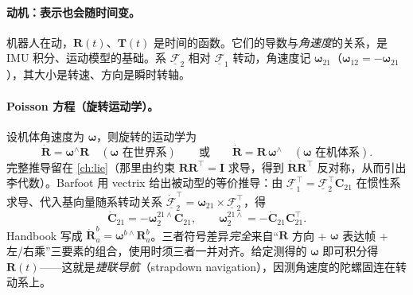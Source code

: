 \paragraph{动机：表示也会随时间变。}机器人在动，$\mathbf{R}(t)$、$\mathbf{T}(t)$ 是时间的函数。它们的导数与\emph{角速度}的关系，是 IMU 积分、运动模型的基础。系 $\underline{\mathcal{F}}_2$ 相对 $\underline{\mathcal{F}}_1$ 转动，角速度记 $\boldsymbol{\omega}_{21}$（$\boldsymbol{\omega}_{12}=-\boldsymbol{\omega}_{21}$），其大小是转速、方向是瞬时转轴\cite{barfoot2024state}。

\paragraph{Poisson 方程（旋转运动学）。}设机体角速度为 $\boldsymbol{\omega}$，则旋转的运动学为
\begin{equation}
  \dot{\mathbf{R}}=\boldsymbol{\omega}^\wedge\mathbf{R}\quad(\boldsymbol{\omega}\text{ 在世界系})\qquad\text{或}\qquad
  \dot{\mathbf{R}}=\mathbf{R}\,\boldsymbol{\omega}^\wedge\quad(\boldsymbol{\omega}\text{ 在机体系}).
  \label{eq:poisson}
\end{equation}
完整推导留在 \cref{ch:lie}（那里由约束 $\mathbf{R}\mathbf{R}^\top=\mathbf{I}$ 求导，得到 $\dot{\mathbf{R}}\mathbf{R}^\top$ 反对称，从而引出李代数）。Barfoot 用 vectrix 给出被动型的等价推导\cite{barfoot2024state}：由 $\underline{\mathcal{F}}_1^\top=\underline{\mathcal{F}}_2^\top\mathbf{C}_{21}$ 在惯性系求导、代入基向量随系转动关系 $\dot{\underline{\mathcal{F}}}_2^\top=\boldsymbol{\omega}_{21}\times\underline{\mathcal{F}}_2^\top$，得
\begin{equation}
  \dot{\mathbf{C}}_{21}=-\boldsymbol{\omega}_2^{21\wedge}\mathbf{C}_{21},\qquad
  \boldsymbol{\omega}_2^{21\wedge}=-\dot{\mathbf{C}}_{21}\mathbf{C}_{21}^\top.
  \label{eq:rb-poisson-barfoot}
\end{equation}
Handbook 写成 $\dot{\mathbf{R}}_a^b=\boldsymbol{\omega}^{b\wedge}\mathbf{R}_a^b$\cite{carlone2026handbook}。三者符号差异\emph{完全}来自“$\mathbf{R}$ 方向 + $\boldsymbol{\omega}$ 表达帧 + 左/右乘”三要素的组合，使用时须三者一并对齐。给定测得的 $\boldsymbol{\omega}$ 即可积分得 $\mathbf{R}(t)$——这就是\emph{捷联导航}（strapdown navigation），因测角速度的陀螺固连在转动系上。

